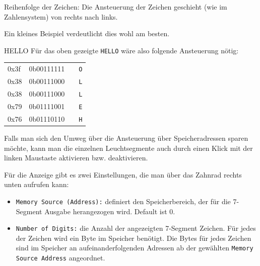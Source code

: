 \begin{warningblock}
Reihenfolge der Zeichen: Die Ansteuerung der Zeichen geschieht (wie im Zahlensystem) von rechts nach links.
\end{warningblock}

Ein kleines Beispiel verdeutlicht dies wohl am besten.

\begin{exampleblock}{HELLO}
	Für das oben gezeigte \texttt{HELLO} wäre also folgende Ansteuerung nötig:\\
	\begin{tabular}{llll}
	0x3f & 0b00111111 & & \texttt{O}\\
	0x38 & 0b00111000 & & \texttt{L}\\
	0x38 & 0b00111000 & & \texttt{L}\\
	0x79 & 0b01111001 & & \texttt{E}\\
	0x76 & 0b01110110 & & \texttt{H}\\
	\end{tabular}
\end{exampleblock}

Falls man sich den Umweg über die Ansteuerung über Speicheradressen sparen möchte,
kann man die einzelnen Leuchtsegmente auch durch einen Klick mit der linken Maustaste aktivieren bzw. deaktivieren.

Für die Anzeige gibt es zwei Einstellungen, die man über das Zahnrad rechts unten aufrufen kann:\\
\begin{itemize}
\item \texttt{Memory Source (Address):} definiert den Speicherbereich, der für die 7-Segment Ausgabe herangezogen wird. Default ist 0.
\item \texttt{Number of Digits:} die Anzahl der angezeigten 7-Segment Zeichen. Für jedes der Zeichen wird ein Byte im Speicher benötigt.
					Die Bytes für jedes Zeichen sind im Speicher an aufeinanderfolgenden Adressen ab der gewählten  \texttt{Memory Source Address} angeordnet.
\end{itemize}



